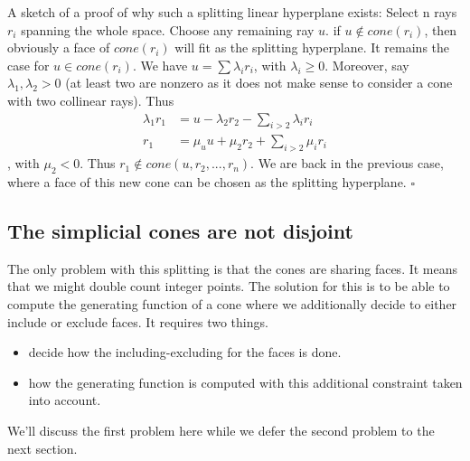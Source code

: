 \documentclass[14pt]{article}
\begin{document}
A sketch of a proof of why such a splitting linear hyperplane exists:
Select n rays $r_i$ spanning the whole space.
Choose any remaining ray $u$. if $u \not \in cone(r_i)$, then obviously a face of $cone(r_i)$ will fit as the splitting hyperplane.
It remains the case for $u \in cone(r_i)$. We have $u = \sum \lambda_i r_i$, with $\lambda_i \ge 0$. Moreover, say $\lambda_1, \lambda_2 > 0$ (at least two are nonzero as it does not make sense to consider a cone with two collinear rays). Thus 
\begin{align*}
  \lambda_1 r_1 &= u - \lambda_2 r_2  - \sum_{i>2} \lambda_i r_i  \\
  r_1 &= \mu_u u + \mu_2 r_2  + \sum_{i>2} \mu_i r_i
\end{align*}
, with $\mu_2 < 0$. Thus $r_1 \not \in cone(u, r_2, ..., r_n)$. We are back in the previous case, where a face of this new cone can be chosen as the splitting hyperplane. $\square$


\subsection*{The simplicial cones are not disjoint}
The only problem with this splitting is that the cones are sharing faces. It means that we might double count integer points.
The solution for this is to be able to compute the generating function of a cone where we additionally decide to either include or exclude faces.
It requires two things. 
\begin{itemize}
\item decide how the including-excluding for the faces is done.
\item how the generating function is computed with this additional constraint taken into account.
\end{itemize}

We'll discuss the first problem here while we defer the second problem to the next section.
\end{document}
